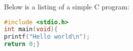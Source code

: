 \documentclass[a4paper, 12pt]{report}
\begin{document}
Below is a listing of a simple C program: 
\begin{lstlisting}[language=C]
#include <stdio.h>
int main(void){
printf("Hello world\n");
return 0;}
\end{lstlisting}
\end{document}
